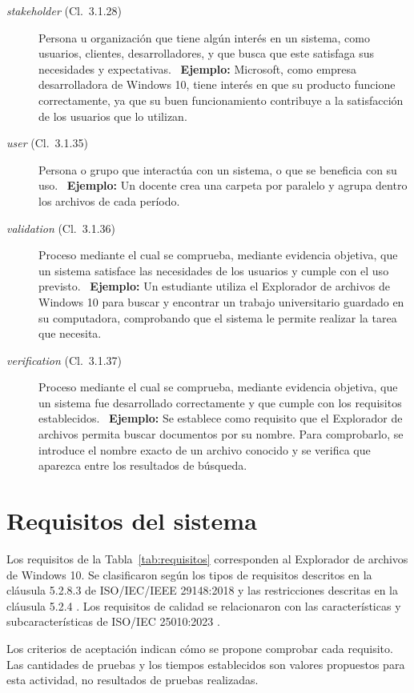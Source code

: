 \documentclass[10pt,a4paper]{article}
\begin{document}
{\begin{description}
\item[\textit{stakeholder} (Cl.~3.1.28)] Persona u organización que tiene algún interés en un sistema, como usuarios, clientes, desarrolladores, y que busca que este satisfaga sus necesidades y expectativas. \ \textbf{Ejemplo:} Microsoft, como empresa desarrolladora de Windows 10, tiene interés en que su producto funcione correctamente, ya que su buen funcionamiento contribuye a la satisfacción de los usuarios que lo utilizan.
\item[\textit{user} (Cl.~3.1.35)] Persona o grupo que interactúa con un sistema, o que se beneficia con su uso. \ \textbf{Ejemplo:} Un docente crea una carpeta por paralelo y agrupa dentro los archivos de cada período.
\item[\textit{validation} (Cl.~3.1.36)] Proceso mediante el cual se comprueba, mediante evidencia objetiva, que un sistema satisface las necesidades de los usuarios y cumple con el uso previsto. \ \textbf{Ejemplo:} Un estudiante utiliza el Explorador de archivos de Windows 10 para buscar y encontrar un trabajo universitario guardado en su computadora, comprobando que el sistema le permite realizar la tarea que necesita.
\item[\textit{verification} (Cl.~3.1.37)] Proceso mediante el cual se comprueba, mediante evidencia objetiva, que un sistema fue desarrollado correctamente y que cumple con los requisitos establecidos. \ \textbf{Ejemplo:} Se establece como requisito que el Explorador de archivos permita buscar documentos por su nombre. Para comprobarlo, se introduce el nombre exacto de un archivo conocido y se verifica que aparezca entre los resultados de búsqueda.
\end{description}}

\section{Requisitos del sistema}

Los requisitos de la Tabla~\ref{tab:requisitos} corresponden al Explorador de archivos de Windows 10. Se clasificaron según los tipos de requisitos descritos en la cláusula 5.2.8.3 de ISO/IEC/IEEE 29148:2018 \cite[Cl.~5.2.8.3]{iso29148} y las restricciones descritas en la cláusula 5.2.4 \cite[Cl.~5.2.4]{iso29148}. Los requisitos de calidad se relacionaron con las características y subcaracterísticas de ISO/IEC 25010:2023 \cite{iso25010}.

Los criterios de aceptación indican cómo se propone comprobar cada requisito. Las cantidades de pruebas y los tiempos establecidos son valores propuestos para esta actividad, no resultados de pruebas realizadas.
\end{document}
